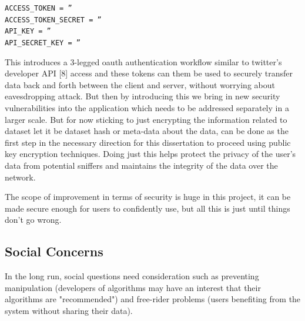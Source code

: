 \quad\quad\quad\quad\quad\quad\quad\quad\quad\quad\quad\quad\quad\quad
\texttt{ACCESS\_TOKEN = ''\\}
\quad\quad\quad\quad\quad\quad\quad\quad\quad\quad\quad\quad\quad\quad
\texttt{ACCESS\_TOKEN\_SECRET = ''\\}
\quad\quad\quad\quad\quad\quad\quad\quad\quad\quad\quad\quad\quad\quad
\texttt{API\_KEY = ''\\}
\quad\quad\quad\quad\quad\quad\quad\quad\quad\quad\quad\quad\quad\quad
\texttt{API\_SECRET\_KEY = ''}

This introduces a 3-legged oauth authentication workflow similar to twitter’s developer API [8] access and these tokens can them be used to securely transfer data back and forth between the client and server, without worrying about eavesdropping attack. But then by introducing this we bring in new security vulnerabilities into the application which needs to be addressed separately in a larger scale. But for now sticking to just encrypting the information related to dataset let it be dataset hash or meta-data about the data, can be done as the first step in the necessary direction for this dissertation to proceed using public key encryption techniques. Doing just this helps protect the privacy of the user’s data from potential sniffers and maintains the integrity of the data over the network.

The scope of improvement in terms of security is huge in this project, it can be made secure enough for users to confidently use, but all this is just until things don’t go wrong.

\subsection{Social Concerns}
In the long run, social questions need consideration such as preventing manipulation (developers of algorithms may have an interest that their algorithms are "recommended") and free-rider problems (users benefiting from the system without sharing their data).

